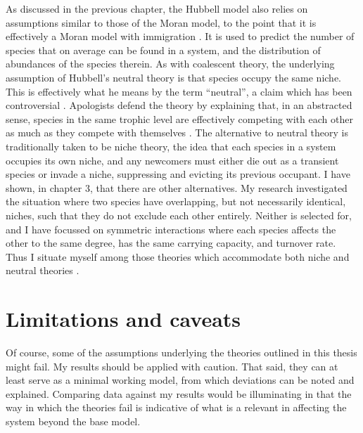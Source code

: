 As discussed in the previous chapter, the Hubbell model also relies on assumptions similar to those of the Moran model, to the point that it is effectively a Moran model with immigration \cite{Hubbell2001,others?}. 
It is used to predict the number of species that on average can be found in a system, and the distribution of abundances of the species therein. 
As with coalescent theory, the underlying assumption of Hubbell's neutral theory is that species occupy the same niche. 
This is effectively what he means by the term ``neutral'', a claim which has been controversial \cite{???}. 
Apologists defend the theory by explaining that, in an abstracted sense, species in the same trophic level are effectively competing with each other as much as they compete with themselves \cite{???}. 
The alternative to neutral theory is traditionally taken to be niche theory, the idea that each species in a system occupies its own niche, and any newcomers must either die out as a transient species or invade a niche, suppressing and evicting its previous occupant. 
I have shown, in chapter 3, that there are other alternatives. 
My research investigated the situation where two species have overlapping, but not necessarily identical, niches, such that they do not exclude each other entirely. 
Neither is selected for, and I have focussed on symmetric interactions where each species affects the other to the same degree, has the same carrying capacity, and turnover rate. 
Thus I situate myself among those theories which accommodate both niche and neutral theories \cite{???}. 



\section{Limitations and caveats}
Of course, some of the assumptions underlying the theories outlined in this thesis might fail. %
My results should be applied with caution. 
That said, they can at least serve as a minimal working model, from which deviations can be noted and explained. 
Comparing data against my results would be illuminating in that the way in which the theories fail is indicative of what is a relevant in affecting the system beyond the base model. 

